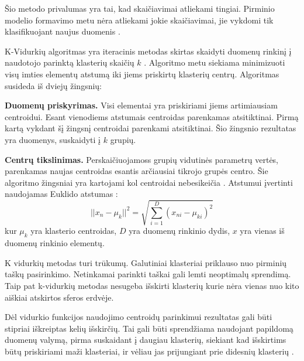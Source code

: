 Šio metodo privalumas yra tai,  kad skaičiavimai atliekami tingiai. Pirminio modelio formavimo metu nėra atliekami jokie skaičiavimai, jie vykdomi tik klasifikuojant naujus duomenis \cite{Wu2008}.





 K-Vidurkių algoritmas yra iteracinis metodas skirtas skaidyti duomenų rinkinį į naudotojo parinktą klasterių skaičių $k$ \cite{Wu2008}. Algoritmo metu siekiama minimizuoti visų imties elementų atstumą iki jiems priskirtų klasterių centrų. Algoritmas susideda iš dviejų žingsnių:

 \textbf{Duomenų priskyrimas.} Visi elementai yra priskiriami jiems artimiausiam centroidui. Esant vienodiems atstumais centroidas parenkamas atsitiktinai. Pirmą kartą vykdant šį žingsnį centroidai parenkami atsitiktinai. Šio žingsnio rezultatas yra duomenys, suskaidyti į $k$ grupių.

 \textbf{Centrų tikslinimas.} Perskaičiuojamoss grupių vidutinės parametrų vertės, parenkamas naujas centroidas esantis arčiausiai tikrojo grupės centro.
 Šie algoritmo žingsniai yra kartojami kol centroidai nebesikeičia \cite{Wu2008}. Atstumui įvertinti naudojamas Euklido atstumas \cite{comp}:
   \begin{equation}
   ||x_n - \mu_k||^2 = \sqrt{\sum_{i=1}^{D}(x_{ni} - \mu_{ki})^2}
   \end{equation}
   kur $\mu_k$ yra klasterio centroidas, $D$ yra duomenų rinkinio dydis, $x$ yra vienas iš duomenų rinkinio elementų.

   K vidurkių metodas turi trūkumų. Galutiniai klasteriai priklauso nuo pirminių taškų pasirinkimo. Netinkamai parinkti taškai gali lemti neoptimalų sprendimą. Taip pat k-vidurkių metodas nesugeba išskirti klasterių kurie nėra vienas nuo kito aiškiai atskirtos sferos erdvėje.

   Dėl vidurkio funkcijos naudojimo centroidų parinkimui rezultatas gali būti stipriai iškreiptas kelių išskirčių. Tai gali būti sprendžiama naudojant papildomą duomenų valymą, pirma suskaidant į daugiau klasterių, siekiant kad išskirtims būtų priskiriami maži klasteriai, ir vėliau jas prijungiant prie didesnių klasterių \cite{Wu2008}.


